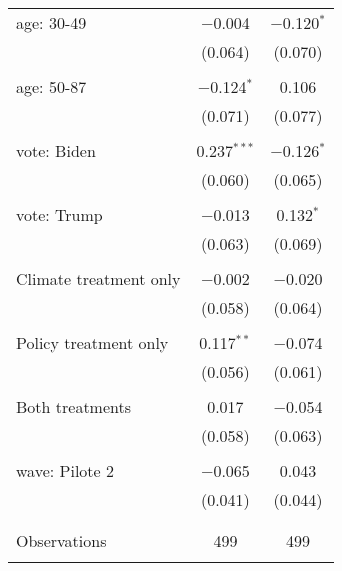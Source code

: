 \begin{tabular}{@{\extracolsep{5pt}}lcc}
 age: 30-49 & $-$0.004 & $-$0.120$^{*}$ \\ 
  & (0.064) & (0.070) \\ 
  & & \\ 
 age: 50-87 & $-$0.124$^{*}$ & 0.106 \\ 
  & (0.071) & (0.077) \\ 
  & & \\ 
 vote: Biden & 0.237$^{***}$ & $-$0.126$^{*}$ \\ 
  & (0.060) & (0.065) \\ 
  & & \\ 
 vote: Trump & $-$0.013 & 0.132$^{*}$ \\ 
  & (0.063) & (0.069) \\ 
  & & \\ 
 Climate treatment only & $-$0.002 & $-$0.020 \\ 
  & (0.058) & (0.064) \\ 
  & & \\ 
 Policy treatment only & 0.117$^{**}$ & $-$0.074 \\ 
  & (0.056) & (0.061) \\ 
  & & \\ 
 Both treatments & 0.017 & $-$0.054 \\ 
  & (0.058) & (0.063) \\ 
  & & \\ 
 wave: Pilote 2 & $-$0.065 & 0.043 \\ 
  & (0.041) & (0.044) \\ 
  & & \\ 
\hline \\[-1.8ex] 

Observations & 499 & 499 \\ 
\hline 
\hline \\[-1.8ex] 
\end{tabular} 